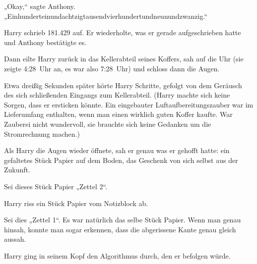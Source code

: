 „Okay,“ sagte Anthony. „Einhunderteinundachtzigtausendvierhundertundneunundzwanzig.“

Harry schrieb 181.429 auf. Er wiederholte, was er gerade aufgeschrieben hatte und Anthony bestätigte es.

Dann eilte Harry zurück in das Kellerabteil seines Koffers, sah auf die Uhr (sie zeigte 4:28~Uhr an, es war also 7:28~Uhr) und schloss dann die Augen.

Etwa dreißig Sekunden später hörte Harry Schritte, gefolgt von dem Geräusch des sich schließenden Eingangs zum Kellerabteil. (Harry machte sich keine Sorgen, dass er ersticken könnte. Ein eingebauter Luftaufbereitungszauber war im Lieferumfang enthalten, wenn man einen wirklich guten Koffer kaufte. War Zauberei nicht wundervoll, sie brauchte sich keine Gedanken um die Stromrechnung machen.)

Als Harry die Augen wieder öffnete, sah er genau was er gehofft hatte: ein gefaltetes Stück Papier auf dem Boden, das Geschenk von sich selbst aus der Zukunft.

Sei dieses Stück Papier „Zettel 2“.

Harry riss ein Stück Papier vom Notizblock ab.

Sei dies „Zettel 1“. Es war natürlich das selbe Stück Papier. Wenn man genau hinsah, konnte man sogar erkennen, dass die abgerissene Kante genau gleich aussah.

Harry ging in seinem Kopf den Algorithmus durch, den er befolgen würde.

